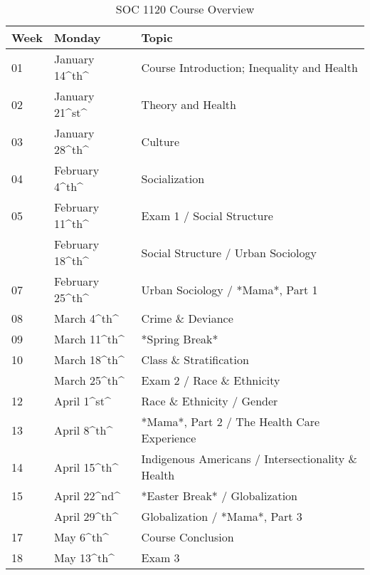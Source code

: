 \documentclass[]{book}
\begin{document}
\begin{table}[t]

\caption{\label{tab:unnamed-chunk-1}SOC 1120 Course Overview}
\centering
\begin{tabular}{lll}
\toprule
Week & Monday & Topic\\
\midrule
01 & January 14\textasciicircum{}th\textasciicircum{} & Course Introduction; Inequality and Health\\
02 & January 21\textasciicircum{}st\textasciicircum{} & Theory and Health\\
03 & January 28\textasciicircum{}th\textasciicircum{} & Culture\\
04 & February 4\textasciicircum{}th\textasciicircum{} & Socialization\\
05 & February 11\textasciicircum{}th\textasciicircum{} & Exam 1 / Social Structure\\
\addlinespace
06 & February 18\textasciicircum{}th\textasciicircum{} & Social Structure / Urban Sociology\\
07 & February 25\textasciicircum{}th\textasciicircum{} & Urban Sociology / *Mama*, Part 1\\
08 & March 4\textasciicircum{}th\textasciicircum{} & Crime \& Deviance\\
09 & March 11\textasciicircum{}th\textasciicircum{} & *Spring Break*\\
10 & March 18\textasciicircum{}th\textasciicircum{} & Class \& Stratification\\
\addlinespace
11 & March 25\textasciicircum{}th\textasciicircum{} & Exam 2 / Race \& Ethnicity\\
12 & April 1\textasciicircum{}st\textasciicircum{} & Race \& Ethnicity / Gender\\
13 & April 8\textasciicircum{}th\textasciicircum{} & *Mama*, Part 2 / The Health Care Experience\\
14 & April 15\textasciicircum{}th\textasciicircum{} & Indigenous Americans / Intersectionality \& Health\\
15 & April 22\textasciicircum{}nd\textasciicircum{} & *Easter Break* / Globalization\\
\addlinespace
16 & April 29\textasciicircum{}th\textasciicircum{} & Globalization / *Mama*, Part 3\\
17 & May 6\textasciicircum{}th\textasciicircum{} & Course Conclusion\\
18 & May 13\textasciicircum{}th\textasciicircum{} & Exam 3\\
\bottomrule
\end{tabular}
\end{table}
\end{document}

